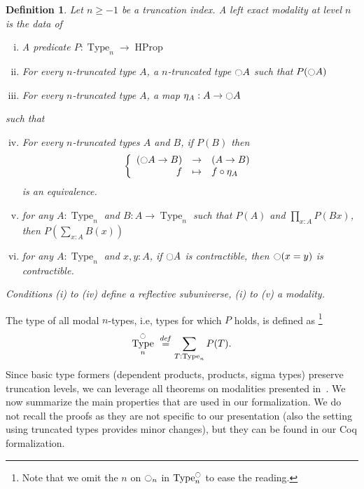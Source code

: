 \documentclass[preprint,9pt,numbers]{sigplanconf}
\newtheorem{defi}[thm]{Definition}
\newcommand \defeq {\overset{de\hspace{-0.2ex}f}{=}}
\newcommand{\ie}{i.e,\xspace}
\DeclareMathOperator{\Type}{Type}
\DeclareMathOperator{\HProp}{HProp}
\newcommand{\modal}{\ensuremath{\ocircle}}
\newenvironment{mymath}[1][-0em]{%
  \newcommand\mymathaux{\vspace{#1}}%
  \vspace{#1}%
  \begin{equation*}%
  }{ %
    \mymathaux%
  \end{equation*}}
\begin{document}
\begin{defi}
  \label{sec:defin-basic-prop-1}
  Let $n\geq -1$ be a truncation index. A left exact modality at level
  $n$ is the data of
  \begin{enumerate}[(i)]
  \item A predicate $P:\Type_n \to \HProp$
  \item For every $n$-truncated type $A$, a $n$-truncated type
    $\modal A$ such that $P(\modal A)$
  \item For every $n$-truncated type $A$, a map $\eta_A:A \to
    \modal A$
  \end{enumerate}
  such that
  \begin{enumerate}[(i)]
    \setcounter{enumi}{3}
  \item For every $n$-truncated types $A$ and $B$, if $P(B)$ then
    \begin{mymath}\left\{
      \begin{array}{rcl}
        (\modal A \to B) & \to & (A \to B) \\
        f & \mapsto & f \circ \eta_A
      \end{array} \right.\end{mymath}%
    is an equivalence.
  \item for any $A:\Type_n$ and $B:A \to \Type_n$ such that $P(A)$
    and $\prod_{x:A} P(B x)$, then $P\left( \sum_{x:A} B(x)\right)$
  \item for any $A:\Type_n$ and $x,y:A$, if $\modal A$ is
    contractible, then $\modal (x=y)$ is contractible.
  \end{enumerate}
  Conditions (i) to (iv) define a {\em reflective subuniverse}, (i) to
  (v) a {\em modality}.
\end{defi}

The type of all modal $n$-types, \ie types for which $P$ holds, is
defined as \footnote{Note that we omit the $n$
on $\modal_n$ in $\Type_n^\modal$ to ease the reading.} %
\begin{mymath}
\Type_n^\modal \ \defeq \sum_{T : \Type_n} P (T).
\end{mymath}%
%
Since basic type formers (dependent products, products, sigma types)
preserve truncation levels, we can leverage all theorems on modalities
presented in~\cite[Chapter 7.7]{hottbook}.
%
We now summarize the main properties that are used in our
formalization. We do not recall the proofs as they are not specific to
our presentation (also the setting using truncated types provides
minor changes), but they can be found in our Coq formalization. 
 
\end{document}
